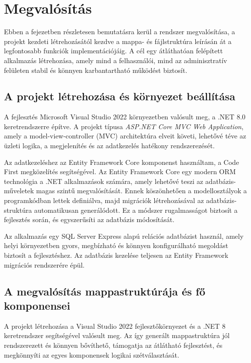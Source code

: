 \section{Megvalósítás}

Ebben a fejezetben részletesen bemutatásra kerül a rendszer megvalósítása, a projekt kezdeti létrehozásától kezdve a mappa- és fájlstruktúra leírásán át a legfontosabb funkciók implementációjáig. A cél egy átláthatóan felépített alkalmazás létrehozása, amely mind a felhasználói, mind az adminisztratív felületen stabil és könnyen karbantartható működést biztosít.

\subsection{A projekt létrehozása és környezet beállítása}

A fejlesztés Microsoft Visual Studio 2022 környezetben valósult meg, a .NET 8.0 keretrendszerre építve. A projekt típusa \textit{ASP.NET Core MVC Web Application}, amely a model-view-controller (MVC) architektúra elveit követi, lehetővé téve az üzleti logika, a megjelenítés és az adatkezelés hatékony rendszerezését.

Az adatkezeléshez az Entity Framework Core komponenst használtam, a Code First megközelítés segítségével. Az Entity Framework Core egy modern ORM technológia a .NET alkalmazások számára, amely lehetővé teszi az adatbázis-műveletek magas szintű megvalósítását. Ennek köszönhetően a modellosztályok a programkódban lettek definiálva, majd migrációk létrehozásával az adatbázis-struktúra automatikusan generálódott. Ez a módszer rugalmasságot biztosít a fejlesztés során, és egyszerűsíti az adatbázis módosítását.

Az alkalmazás egy SQL Server Express alapú relációs adatbázist használ, amely helyi környezetben gyors, megbízható és könnyen konfigurálható megoldást biztosít a fejlesztéshez. Az adatbázis kezelése teljesen az Entity Framework migrációs rendszerére épül.

\subsection{A megvalósítás mappastruktúrája és fő komponensei}

A projekt létrehozása a Visual Studio 2022 fejlesztőkörnyezet és a .NET 8 keretrendszer segítségével valósult meg. Az így generált mappastruktúra jól rendszerezett és könnyen bővíthető, támogatja az átlátható fejlesztést, és megkönnyíti az egyes komponensek logikai szétválasztását.

